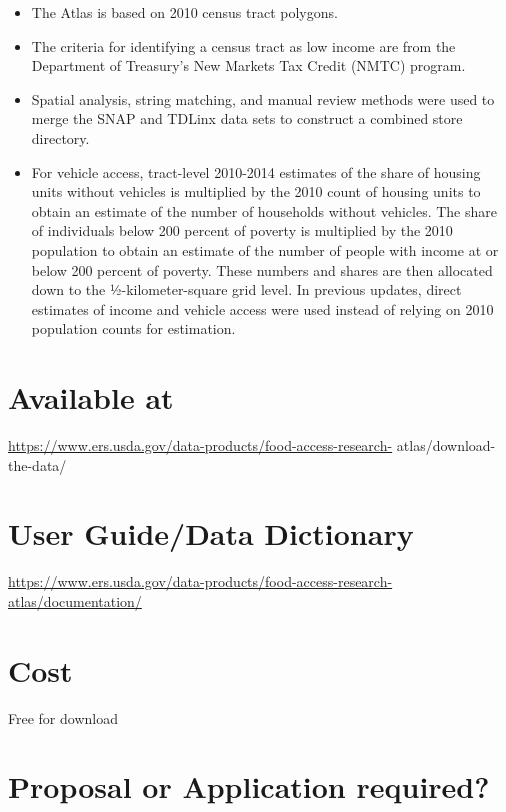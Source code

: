\documentclass[
]{book}
\providecommand{\tightlist}{%
  \setlength{\itemsep}{0pt}\setlength{\parskip}{0pt}}
\begin{document}
\begin{itemize}
\tightlist
\item
  The Atlas is based on 2010 census tract polygons.
\item
  The criteria for identifying a census tract as low income are from the Department of Treasury's New Markets Tax Credit (NMTC) program.
\item
  Spatial analysis, string matching, and manual review methods were used to merge the SNAP and TDLinx data sets to construct a combined store directory.
\item
  For vehicle access, tract-level 2010-2014 estimates of the share of housing units without vehicles is multiplied by the 2010 count of housing units to obtain an estimate of the number of households without vehicles. The share of individuals below 200 percent of poverty is multiplied by the 2010 population to obtain an estimate of the number of people with income at or below 200 percent of poverty. These numbers and shares are then allocated down to the ½-kilometer-square grid level. In previous updates, direct estimates of income and vehicle access were used instead of relying on 2010 population counts for estimation.
\end{itemize}

\hypertarget{available-at-25}{%
\section{Available at}\label{available-at-25}}

\url{https://www.ers.usda.gov/data-products/food-access-research-} atlas/download-the-data/

\hypertarget{user-guidedata-dictionary-25}{%
\section{User Guide/Data Dictionary}\label{user-guidedata-dictionary-25}}

\url{https://www.ers.usda.gov/data-products/food-access-research-atlas/documentation/}

\hypertarget{cost-25}{%
\section{Cost}\label{cost-25}}

Free for download

\hypertarget{proposal-or-application-required-25}{%
\section{Proposal or Application required?}\label{proposal-or-application-required-25}}
\end{document}

